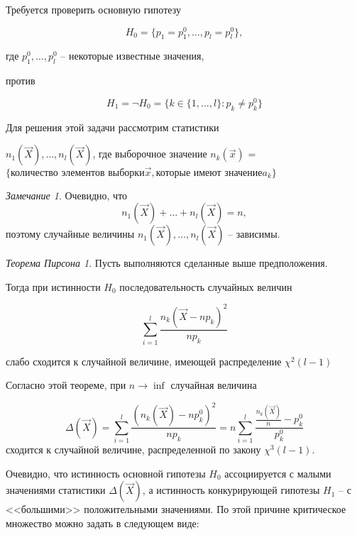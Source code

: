 \documentclass[a4paper, 12pt]{article}
\theoremstyle{definition}
\theoremstyle{leads}
\theoremstyle{example}
\theoremstyle{remark}
\newtheorem{remark}{Замечание}
\begin{document}
Требуется проверить основную гипотезу

\begin{equation*}
	H_0 = \{p_1 = p_1^0, \dots, p_l = p_l^0\}, 
\end{equation*}

где $p_1^0, \dots, p_l^0$ -- некоторые известные значения,

против

\begin{equation*}
	H_1 = \neg H_0 = \{k \in \{1, \dots, l\} : p_k \neq p_k^0\} 
\end{equation*}

Для решения этой задачи рассмотрим статистики

$n_1(\vec{X}), \dots, n_l(\vec{X})$, где выборочное значение $n_k(\vec{x})$ = $\{\text{количество элементов выборки} \vec{x}, \text{которые имеют значение} a_k \}$

\begin{remark}
	Очевидно, что 
	\begin{equation*}
		n_1(\vec{X}) + \dots + n_l(\vec{X}) = n,
	\end{equation*}
	поэтому случайные величины $n_1(\vec{X}), \dots, n_l(\vec{X})$ -- зависимы.
\end{remark}

\newtheorem*{Piersonn}{Теорема Пирсона}
\begin{Piersonn}
Пусть выполняются сделанные выше предположения.

Тогда при истинности $H_0$ последовательность случайных величин

\begin{center}
	\centering
	$$\sum_{i=1}^{l} \frac{n_k(\vec{X} - np_k)^2}{n p_k}$$
\end{center}

слабо сходится к случайной величине, имеющей распределение $\chi^2(l - 1)$
\end{Piersonn}

Согласно этой теореме, при $n \longrightarrow \inf$ случайная величина

\begin{equation*}
	\Delta(\vec{X}) = \sum_{i=1}^{l} \frac{(n_k(\vec{X}) - n p_k^0)^2}{n p_k} = n \sum_{i=1}^{l} \frac{\frac{n_k(\vec{X})}{n} - p_k^0}{p_k^0}
\end{equation*}
сходится к случайной величине, распределенной по закону $\chi^3(l - 1)$.

Очевидно, что истинность основной гипотезы $H_0$ ассоциируется с малыми значениями статистики $\Delta(\vec{X})$, а истинность конкурирующей гипотезы $H_1$ -- с <<большими>> положительными значениями. По этой причине критическое множество можно задать в следующем виде:
\end{document}
